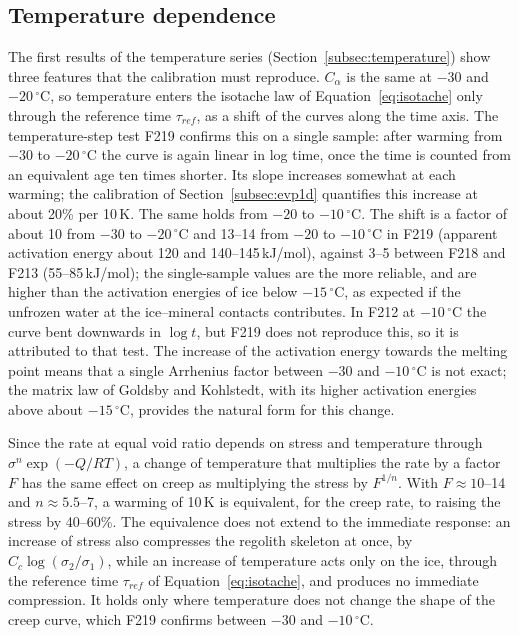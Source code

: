 \subsection{Temperature dependence}
The first results of the temperature series (Section~\ref{subsec:temperature}) show three features that the calibration must reproduce. $C_\alpha$ is the same at $-30$ and $-20\,^\circ$C, so temperature enters the isotache law of Equation~\eqref{eq:isotache} only through the reference time $\tau_{ref}$, as a shift of the curves along the time axis. The temperature-step test F219 confirms this on a single sample: after warming from $-30$ to $-20\,^\circ$C the curve is again linear in log time, once the time is counted from an equivalent age ten times shorter. Its slope increases somewhat at each warming; the calibration of Section~\ref{subsec:evp1d} quantifies this increase at about 20\% per 10\,K. The same holds from $-20$ to $-10\,^\circ$C. The shift is a factor of about 10 from $-30$ to $-20\,^\circ$C and 13--14 from $-20$ to $-10\,^\circ$C in F219 (apparent activation energy about 120 and 140--145\,kJ/mol), against 3--5 between F218 and F213 (55--85\,kJ/mol); the single-sample values are the more reliable, and are higher than the activation energies of ice below $-15\,^\circ$C, as expected if the unfrozen water at the ice--mineral contacts contributes. In F212 at $-10\,^\circ$C the curve bent downwards in $\log t$, but F219 does not reproduce this, so it is attributed to that test. The increase of the activation energy towards the melting point means that a single Arrhenius factor between $-30$ and $-10\,^\circ$C is not exact; the matrix law of Goldsby and Kohlstedt, with its higher activation energies above about $-15\,^\circ$C, provides the natural form for this change.

Since the rate at equal void ratio depends on stress and temperature through $\sigma^{n}\exp(-Q/RT)$, a change of temperature that multiplies the rate by a factor $F$ has the same effect on creep as multiplying the stress by $F^{1/n}$. With $F\approx10$--14 and $n\approx5.5$--7, a warming of 10\,K is equivalent, for the creep rate, to raising the stress by 40--60\%. The equivalence does not extend to the immediate response: an increase of stress also compresses the regolith skeleton at once, by $C_c\log(\sigma_2/\sigma_1)$, while an increase of temperature acts only on the ice, through the reference time $\tau_{ref}$ of Equation~\eqref{eq:isotache}, and produces no immediate compression. It holds only where temperature does not change the shape of the creep curve, which F219 confirms between $-30$ and $-10\,^\circ$C.
